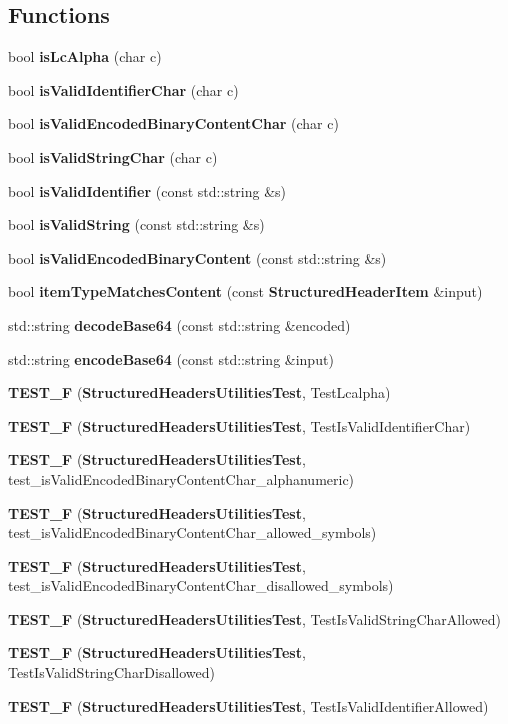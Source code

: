 \subsection*{Functions}
\begin{DoxyCompactItemize}
\item 
bool {\bf is\+Lc\+Alpha} (char c)
\item 
bool {\bf is\+Valid\+Identifier\+Char} (char c)
\item 
bool {\bf is\+Valid\+Encoded\+Binary\+Content\+Char} (char c)
\item 
bool {\bf is\+Valid\+String\+Char} (char c)
\item 
bool {\bf is\+Valid\+Identifier} (const std\+::string \&s)
\item 
bool {\bf is\+Valid\+String} (const std\+::string \&s)
\item 
bool {\bf is\+Valid\+Encoded\+Binary\+Content} (const std\+::string \&s)
\item 
bool {\bf item\+Type\+Matches\+Content} (const {\bf Structured\+Header\+Item} \&input)
\item 
std\+::string {\bf decode\+Base64} (const std\+::string \&encoded)
\item 
std\+::string {\bf encode\+Base64} (const std\+::string \&input)
\item 
{\bf T\+E\+S\+T\+\_\+F} ({\bf Structured\+Headers\+Utilities\+Test}, Test\+Lcalpha)
\item 
{\bf T\+E\+S\+T\+\_\+F} ({\bf Structured\+Headers\+Utilities\+Test}, Test\+Is\+Valid\+Identifier\+Char)
\item 
{\bf T\+E\+S\+T\+\_\+F} ({\bf Structured\+Headers\+Utilities\+Test}, test\+\_\+is\+Valid\+Encoded\+Binary\+Content\+Char\+\_\+alphanumeric)
\item 
{\bf T\+E\+S\+T\+\_\+F} ({\bf Structured\+Headers\+Utilities\+Test}, test\+\_\+is\+Valid\+Encoded\+Binary\+Content\+Char\+\_\+allowed\+\_\+symbols)
\item 
{\bf T\+E\+S\+T\+\_\+F} ({\bf Structured\+Headers\+Utilities\+Test}, test\+\_\+is\+Valid\+Encoded\+Binary\+Content\+Char\+\_\+disallowed\+\_\+symbols)
\item 
{\bf T\+E\+S\+T\+\_\+F} ({\bf Structured\+Headers\+Utilities\+Test}, Test\+Is\+Valid\+String\+Char\+Allowed)
\item 
{\bf T\+E\+S\+T\+\_\+F} ({\bf Structured\+Headers\+Utilities\+Test}, Test\+Is\+Valid\+String\+Char\+Disallowed)
\item 
{\bf T\+E\+S\+T\+\_\+F} ({\bf Structured\+Headers\+Utilities\+Test}, Test\+Is\+Valid\+Identifier\+Allowed)

\end{DoxyCompactItemize}
